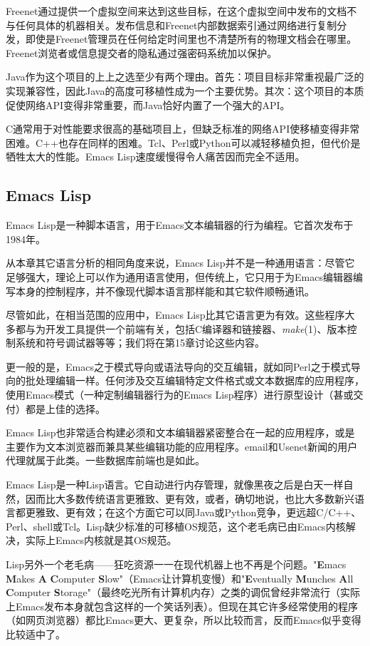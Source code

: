\documentclass[12pt,oneside]{book}
\begin{document}
\begin{common-format}
Freenet通过提供一个虚拟空间来达到这些目标，在这个虚拟空间中发布的文档不与任何具体的机器相关。发布信息和Freenet内部数据索引通过网络进行复制分发，即使是Freenet管理员在任何给定时间里也不清楚所有的物理文档会在哪里。Freenet浏览者或信息提交者的隐私通过强密码系统加以保护。

Java作为这个项目的上上之选至少有两个理由。首先：项目目标非常重视最广泛的实现兼容性，因此Java的高度可移植性成为一个主要优势。其次：这个项目的本质促使网络API变得非常重要，而Java恰好内置了一个强大的API。

C通常用于对性能要求很高的基础项目上，但缺乏标准的网络API使移植变得非常困难。C++也存在同样的困难。Tcl、Perl或Python可以减轻移植负担，但代价是牺牲太大的性能。Emacs Lisp速度缓慢得令人痛苦因而完全不适用。

\subsection{Emacs Lisp}
Emacs Lisp是一种脚本语言，用于Emacs文本编辑器的行为编程。它首次发布于1984年。

从本章其它语言分析的相同角度来说，Emacs Lisp并不是一种通用语言：尽管它足够强大，理论上可以作为通用语言使用，但传统上，它只用于为Emacs编辑器编写本身的控制程序，并不像现代脚本语言那样能和其它软件顺畅通讯。

尽管如此，在相当范围的应用中，Emacs Lisp比其它语言更为有效。这些程序大多都与为开发工具提供一个前端有关，包括C编译器和链接器、\textit{make}(1)、版本控制系统和符号调试器等等；我们将在第15章讨论这些内容。

更一般的是，Emacs之于模式导向或语法导向的交互编辑，就如同Perl之于模式导向的批处理编辑一样。任何涉及交互编辑特定文件格式或文本数据库的应用程序，使用Emacs模式（一种定制编辑器行为的Emacs Lisp程序）进行原型设计（甚或交付）都是上佳的选择。

Emacs Lisp也非常适合构建必须和文本编辑器紧密整合在一起的应用程序，或是主要作为文本浏览器而兼具某些编辑功能的应用程序。email和Usenet新闻的用户代理就属于此类。一些数据库前端也是如此。

Emacs Lisp是一种Lisp语言。它自动进行内存管理，就像黑夜之后是白天一样自然，因而比大多数传统语言更雅致、更有效，或者，确切地说，也比大多数新兴语言都更雅致、更有效；在这个方面它可以同Java或Python竞争，更远超C/C++、Perl、shell或Tcl。Lisp缺少标准的可移植OS规范，这个老毛病已由Emacs内核解决，实际上Emacs内核就是其OS规范。

Lisp另外一个老毛病——狂吃资源一一在现代机器上也不再是个问题。"\textbf{E}macs \textbf{M}akes \textbf{A} \textbf{C}omputer \textbf{S}low"（Emacs让计算机变慢）和"\textbf{E}ventually \textbf{M}unches \textbf{A}ll \textbf{C}omputer \textbf{S}torage"（最终吃光所有计算机内存）之类的调侃曾经非常流行（实际上Emacs发布本身就包含这样的一个笑话列表）。但现在其它许多经常使用的程序（如网页浏览器）都比Emacs更大、更复杂，所以比较而言，反而Emacs似乎变得比较适中了。


\end{common-format}
\end{document}
